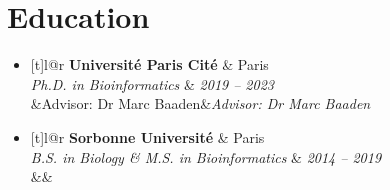 \documentclass[a4paper,11pt]{article}
\makeatletter
\newcommand{\resumeSubheading}[5]{
  \vspace{-1pt}\item
    \begin{tabular*}{\textwidth}[t]{l@{\extracolsep{\fill}}r}
      \textbf{#1} & #2 \\
      \textit{#3} & \textit{#4} \\
      \ifx&#5&\else \textit{#5} \\ \fi
    \end{tabular*}\vspace{-7pt}
}
\newcommand{\resumeSubHeadingListStart}{\begin{itemize}[leftmargin=0pt, label={}, itemsep=0pt]}
\newcommand{\resumeSubHeadingListEnd}{\end{itemize}}
\makeatother
\begin{document}
\section{Education}
  \resumeSubHeadingListStart
    \resumeSubheading
      {Université Paris Cité}{Paris}
      {Ph.D. in Bioinformatics}{2019 -- 2023}
      {Advisor: Dr Marc Baaden}
      
    \resumeSubheading
      {Sorbonne Université}{Paris}
      {B.S. in Biology \& M.S. in Bioinformatics}{2014 -- 2019}
      {}
      
    \resumeSubHeadingListEnd

\nocite{*}
\printbibliography[title=Publications, nottype=cited]
\end{document}
